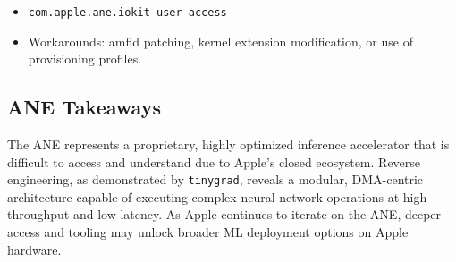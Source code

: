 \begin{itemize}
  \item \texttt{com.apple.ane.iokit-user-access}
  \item Workarounds: amfid patching, kernel extension modification, or use of provisioning profiles.
\end{itemize}

\subsection{ANE Takeaways}

The ANE represents a proprietary, highly optimized inference accelerator that is difficult to access and understand due to Apple’s closed ecosystem. Reverse engineering, as demonstrated by \texttt{tinygrad}, reveals a modular, DMA-centric architecture capable of executing complex neural network operations at high throughput and low latency. As Apple continues to iterate on the ANE, deeper access and tooling may unlock broader ML deployment options on Apple hardware.
